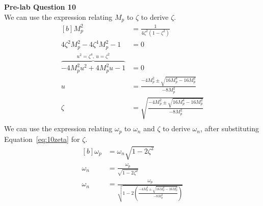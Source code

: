\documentclass[12pt]{article}
\begin{document}
\textbf{Pre-lab Question 10} \\
We can use the expression relating $M_p$ to $\zeta$ to derive $\zeta$.
\begin{equation} \label{eq:10zeta}
\begin{aligned}[b]
    M_p^2 &= \frac{1}{4\zeta^2 (1 - \zeta^2)} \\
    4\zeta^2 M_p^2 - 4\zeta^4 M_p^2 - 1 &= 0 \\
    \overbrace{-4 M_p^2 u^2 + 4 M_p^2 u - 1}^{u^2 = \zeta^4, \ u = \zeta^2} &= 0 \\
    u &= \frac{-4 M_p^2 \pm \sqrt{16 M_p^4 - 16 M_p^2}}{-8 M_p^2} \\
    \zeta &= \sqrt{\frac{-4 M_p^2 \pm \sqrt{16 M_p^4 - 16 M_p^2}}{-8 M_p^2}} \\
\end{aligned}
\end{equation}
We can use the expression relating $\omega_p$ to $\omega_n$ and $\zeta$ to derive $\omega_n$, after substituting Equation~\ref{eq:10zeta} for $\zeta$.
\begin{equation}
\begin{aligned}[b]
    \omega_p &= \omega_n \sqrt{1 - 2\zeta^2} \\
    \omega_n &= \frac{\omega_p}{\sqrt{1 - 2\zeta^2}} \\
    \omega_n &= \frac{\omega_p}{\sqrt{1 - 2 \left( \frac{-4 M_p^2 \pm \sqrt{16 M_p^4 - 16 M_p^2}}{-8 M_p^2} \right)}}
\end{aligned}
\end{equation}
\end{document}
